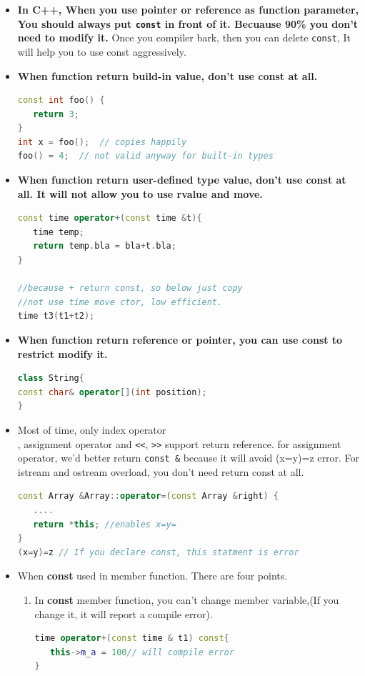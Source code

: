 \documentclass[a4paper,12pt,twoside]{book}
\begin{document}
\begin{itemize}
\item \textbf{In C++, When you use pointer or reference as function parameter, You should always put \texttt{const} in front of it. Becuause 90\% you don't need to modify it. }Once you compiler bark, then you can delete \texttt{const}, It will help you to use const aggressively.

\item \textbf{When function return build-in value, don't use const at all. }
\begin{lstlisting}[frame=single, language=c++]
const int foo() {
   return 3;
}
int x = foo();  // copies happily
foo() = 4;  // not valid anyway for built-in types
\end{lstlisting}

\item \textbf{When function return user-defined type value, don't use const at all. It will not allow you to use rvalue and move. }
\begin{lstlisting}[frame=single, language=c++]
const time operator+(const time &t){
   time temp;
   return temp.bla = bla+t.bla;
}

//because + return const, so below just copy
//not use time move ctor, low efficient.
time t3(t1+t2);
\end{lstlisting}

\item \textbf{When function return reference or pointer, you can use const to restrict modify it.}
\begin{lstlisting}[frame=single, language=c++]
class String{
const char& operator[](int position);
}
\end{lstlisting}

\item Most of time, only index operator \[\], assignment operator and \texttt{<<}, \texttt{>>} support return reference. for assignment operator, we'd better return \texttt{const \&} because it will avoid (x=y)=z error. For istream and ostream overload, you don't need return const at all. 
\begin{lstlisting}[frame=single, language=c++]
const Array &Array::operator=(const Array &right) {
   ....
   return *this; //enables x=y= 
}
(x=y)=z // If you declare const, this statment is error
\end{lstlisting}


\item When \textbf{const} used in member function. There are four points.
\begin{enumerate}
\item In \textbf{const} member function, you can't change member variable,(If you change it, it will report a compile error).
\begin{lstlisting}[frame=single, language=c++]
time operator+(const time & t1) const{
   this->m_a = 100// will compile error
}
\end{lstlisting}


\end{enumerate}
\end{itemize}
\end{document}
